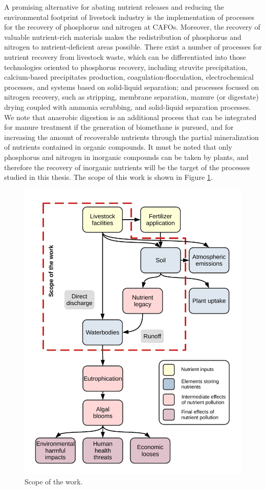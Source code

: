 \begin{refsection}[referencesCh1]
A promising alternative for abating nutrient releases and reducing the environmental footprint of livestock industry is the implementation of processes for the recovery of phosphorus and nitrogen at CAFOs. Moreover, the recovery of valuable nutrient-rich materials makes the redistribution of phosphorus and nitrogen to nutrient-deficient areas possible. There exist a number of processes for nutrient recovery from livestock waste, which can be differentiated into those technologies oriented to phosphorus recovery, including struvite precipitation, calcium-based precipitates production, coagulation-flocculation, electrochemical processes, and systems based on solid-liquid
separation; and processes focused on nitrogen recovery, such as stripping, membrane separation, manure (or digestate) drying coupled with ammonia scrubbing, and
solid-liquid
separation processes. We note that anaerobic digestion is an additional process that can be integrated for manure treatment if the generation of biomethane is pursued, and for increasing the amount of recoverable nutrients through the partial mineralization of nutrients contained in organic compounds. It must be noted that only phosphorus and nitrogen in inorganic compounds can be taken by plants, and therefore the recovery of inorganic nutrients will be the target of the processes studied in this thesis. The scope of this work is shown in Figure \ref{fig:Ch1Scope}. 

\begin{figure}[h]
	\centering
	\includegraphics[width=0.7\linewidth, trim={1cm 1cm 1cm 1cm},clip]{gfx/Chapter1/IntroFig1v2.pdf} 
	\caption{Scope of the work.}
	\label{fig:Ch1Scope}
\end{figure}


\end{refsection}
